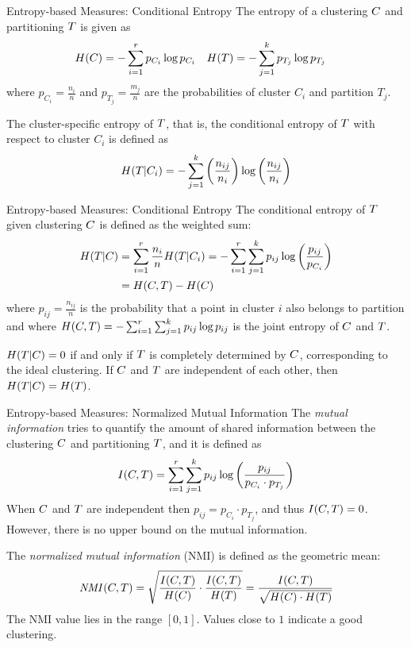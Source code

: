 \begin{frame}{Entropy-based Measures: Conditional Entropy}
The entropy of a clustering ${\relax C}$  and partitioning ${\relax T}$ is given as
\begin{align*}
  H({\relax C}) & = - \sum_{i=1}^r p_{C_i} \log p_{C_i} &
  H({\relax T}) & = - \sum_{j=1}^k p_{T_{j}} \log p_{T_{j}}
\end{align*}
where $p_{C_i} = \tfrac{n_i}{n}$ and $p_{T_{j}} = \tfrac{m_{j}}{n}$
are the probabilities of cluster $C_i$ and partition $T_{j}$.

\bigskip
The cluster-specif\/{i}c entropy of ${\relax T}$, that is, the conditional entropy of
${\relax T}$ with respect to cluster $C_i$ is def\/{i}ned as
\begin{align*}
  H({\relax T}|C_i) = - \sum_{j=1}^k
  \left( \frac{n_{ij}}{n_i} \right)
  \log \left( \frac{n_{ij}}{n_i} \right)
\end{align*}
\end{frame}

\begin{frame}{Entropy-based Measures: Conditional Entropy}
The conditional entropy of ${\relax T}$ given clustering ${\relax C}$ is def\/{i}ned
as the weighted sum:
\begin{align*}
  H({\relax T}|{\relax C}) & = \sum_{i=1}^r \frac{n_{i}}{n} H({\relax T}|C_i)
  = -\sum_{i=1}^r \sum_{j=1}^k p_{ij} \log \left(
  \frac{p_{ij}}{p_{C_i}}\right)\\
  & = H({\relax C},{\relax T}) - H({\relax C})
\end{align*}
where $p_{ij}= \tfrac{n_{ij}}{n}$ is the probability that a point in
cluster $i$ also belongs to partition and 
where $H({\relax C},{\relax T}) = - \sum_{i=1}^r \sum_{j=1}^k p_{ij} \log p_{ij}$ is
the joint entropy of ${\relax C}$ and ${\relax T}$.  

\bigskip
$H({\relax T}|{\relax C}) = 0$ if and only if
${\relax T}$ is completely determined by ${\relax C}$, corresponding to the ideal
clustering.
If ${\relax C}$ and ${\relax T}$ are independent of
each other, then $H({\relax T}|{\relax C}) = H({\relax T})$.
\end{frame}


\begin{frame}{Entropy-based Measures: Normalized Mutual Information} 
The {\em mutual
information} tries to quantify the amount of shared information
between the clustering ${\relax C}$ and partitioning ${\relax T}$, and it is
def\/{i}ned as
\begin{align*}
  I({\relax C},{\relax T}) = \sum_{i=1}^r \sum_{j=1}^k p_{ij} \log
  \left(\frac{p_{ij}}{p_{C_i} \cdot p_{T_{j}}} \right)
\end{align*}
When ${\relax C}$ and ${\relax T}$
are independent then $p_{ij} = p_{C_i} \cdot p_{T_{j}}$, and thus
$I({\relax C},{\relax T}) = 0$. However, there is no upper bound on the mutual
information.


\bigskip
The {\em normalized mutual information} (NMI) is def\/{i}ned as
the geometric mean:
\begin{align*}
  \mathit{NMI}({\relax C},{\relax T}) = \sqrt{\frac{I({\relax C},{\relax T})}{H({\relax C})} \cdot \frac{I({\relax C},{\relax T})}{H({\relax T})}} =
  \frac{I({\relax C},{\relax T})}{\sqrt{H({\relax C})\cdot H({\relax T})}}
\end{align*}
The NMI value lies in the range $[0,1]$. Values close to $1$ indicate a
good clustering.
\end{frame}





